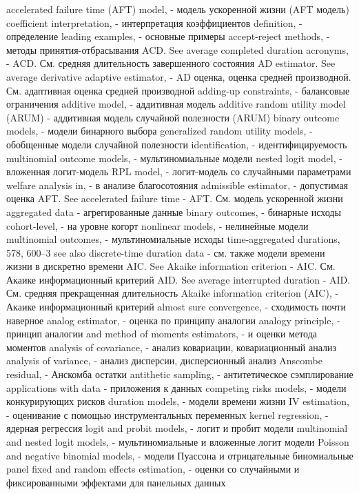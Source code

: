 accelerated failure time (AFT) model, - модель ускоренной жизни (AFT модель)
coefficient interpretation, - интерпретация коэффициентов
definition, - определение
leading examples, - основные примеры
accept-reject methods, - методы принятия-отбрасывания
ACD. See average completed duration acronyms, - ACD. См. средняя длительность завершенного состояния
AD estimator. See average derivative adaptive estimator, - AD оценка, оценка средней производной. См. адаптивная оценка средней производной 
adding-up constraints, - балансовые ограничения
additive model, - аддитивная модель
additive random utility model (ARUM) - аддитивная модель случайной полезности (ARUM)
binary outcome models, - модели бинарного выбора
generalized random utility models, - обобщенные модели случайной полезности
identification, - идентифицируемость
multinomial outcome models, - мультиномиальные модели
nested logit model, - вложенная логит-модель
RPL model, - логит-модель со случайными параметрами 
welfare analysis in, - в анализе благосотояния
admissible estimator, - допустимая оценка
AFT. See accelerated failure time - AFT. См. модель ускоренной жизни
aggregated data - агрегированные данные
binary outcomes, - бинарные исходы
cohort-level, - на уровне когорт
nonlinear models, - нелинейные модели
multinomial outcomes, - мультиномиальные исходы
time-aggregated durations, 578, 600–3 
see also discrete-time duration data - см. также модели времени жизни в дискретно времени
AIC. See Akaike information criterion - AIC. См. Акаике информационный критерий
AID. See average interrupted duration - AID. См. средняя прекращенная длительность
Akaike information criterion (AIC), - Акаике информационный критерий
almost sure convergence, - сходимость почти наверное 
analog estimator, - оценка по принципу аналогии
analogy principle, - принцип аналогии
and method of moments estimators, - и оценки метода моментов
analysis of covariance, - анализ ковариации, ковариационный анализ
analysis of variance, - анализ дисперсии, дисперсионный анализ
Anscombe residual, - Анскомба остатки
antithetic sampling, - антитетическое сэмплирование
applications with data - приложения к данных
competing risks models, - модели конкурирующих рисков
duration models, - модели времени жизни
IV estimation, - оценивание с помощью инструментальных переменных
kernel regression, - ядерная регрессия
logit and probit models, - логит и пробит модели
multinomial and nested logit models, - мультиномиальные и вложенные логит модели
Poisson and negative binomial models, - модели Пуассона и отрицательные биномиальные
panel fixed and random effects estimation, - оценки со случайными и фиксированными эффектами для панельных данных
